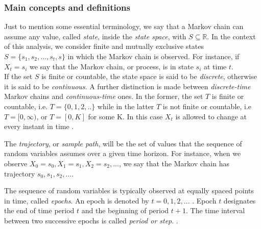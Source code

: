 \documentclass[\main/main.tex]{subfiles}
\begin{document}
\subsubsection{Main concepts and definitions}

Just to mention some essential terminology, we say that a Markov chain can assume any value, called \textit{state}, inside the \textit{state space}, with $S \subseteq \mathds{R}$. In the context of this analysis, we consider finite and mutually exclusive states $S = \{s_1,s_2,...,s_t, s\}$ in which the Markov chain is observed. For instance, if $X_t = s_i$ we say that the Markov chain, or process, is in state $s_i$ at time $t$.\\
If the set $S$ is finite or countable, the state space is said to be \textit{discrete}, otherwise it is said to be \textit{continuous}. A further distinction is made between \textit{discrete-time} Markov chains and \textit{continuous-time} ones. In the former, the set $T$ is finite or countable, i.e. $T = \{ 0,1,2,..\}$ while in the latter $T$ is not finite or countable, i.e $T = [0,\infty)$, or $T = [0,K]$ for some K. In this case $X_t$ is allowed to change at every instant in time \citep{Holmes2015}.



The \textit{trajectory}, or \textit{sample path}, will be the set of values that the sequence of random variables assumes over a given time horizon. For instance, when we observe $X_0 = s_0, X_1 = s_1, X_2 = s_2, ...$, we say that the Markov chain has trajectory $s_0, s_1, s_2,...$. 

The sequence of random variables is typically observed at equally spaced points in time, called 
\textit{epochs}. An epoch is denoted by $t = 0, 1, 2, ...$ . Epoch $t$ designates the end of time period $t$ and the beginning of period $t + 1$. The time interval between two successive epochs is called \textit{period or step}. \citep{Sheskin2010}.\\
\end{document}
